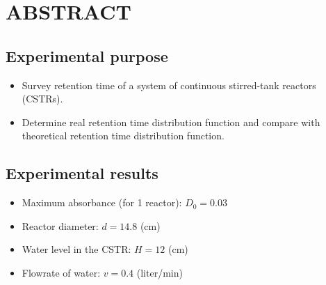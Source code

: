 \section{ABSTRACT}

\subsection{Experimental purpose}
\begin{itemize}
    \item Survey retention time of a system of continuous stirred-tank reactors (CSTRs).
    \item Determine real retention time distribution function and compare with theoretical retention time distribution function.
\end{itemize}

\subsection{Experimental results}
\begin{itemize}
    \item Maximum absorbance (for 1 reactor): $D_0 = 0.03$
    \item Reactor diameter: $d = 14.8$ (cm)
    \item Water level in the CSTR: $H = 12$ (cm)
    \item Flowrate of water: $v = 0.4$ (liter/min)
\end{itemize}
